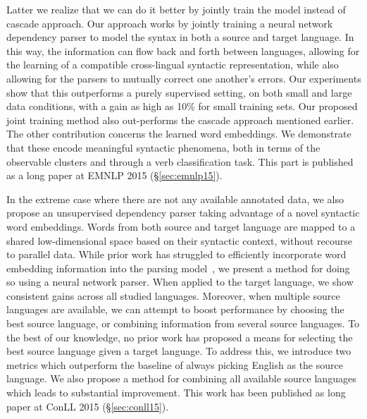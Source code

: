 \documentclass[12pt,twoside,final,hidelinks]{ltthesis}
\theoremstyle{definition}
\newcommand\conllv{ConLL 2015 (\S\ref{sec:conll15})}
\newcommand\emnlpv{EMNLP 2015 (\S\ref{sec:emnlp15})}
\begin{document}
Latter we realize that we can do it better by jointly train the model instead of cascade approach. Our approach works by jointly training a neural network dependency parser to model the syntax in both a source and target language. In this way, the information can flow back and forth between languages, allowing for the learning of a compatible cross-lingual syntactic representation, while also allowing for the parsers to mutually correct one another's errors. 
Our experiments show that this outperforms a purely supervised setting, on both small and large data conditions, with a gain as high as 10\% for small training sets. 
Our proposed joint training method also out-performs the cascade approach mentioned earlier. The other contribution concerns the learned word embeddings.
We demonstrate that these encode meaningful syntactic phenomena, both in terms of the observable clusters and through a verb classification task. This part is published as a long paper at \emnlpv. 

In the extreme case where there are not any available annotated data, we also propose an unsupervised dependency parser taking advantage of a novel syntactic word embeddings. 
Words from both source and target language are mapped to a shared low-dimensional
space based on their syntactic context, without recourse to parallel data.
While prior work has struggled to efficiently incorporate word embedding information into the parsing model~\cite{mohit:ACL14,andreas-klein:2014:P14-2,chen-zhang-zhang:2014:Coling},
we present a method for doing so using a neural network parser. When applied to the target language, we show consistent gains across all studied languages.
Moreover, when multiple source languages are available, we can attempt to boost
performance by choosing the best source language, or combining
information from several source languages. To the best
of our knowledge, no prior work has proposed a means for selecting the
best source language given a target language. To address this, we
introduce two metrics which outperform the baseline of always picking
English as the source language. We also propose a method for combining
all available source languages which leads to substantial improvement.
This work has been published as long paper at \conllv. 
\end{document}
